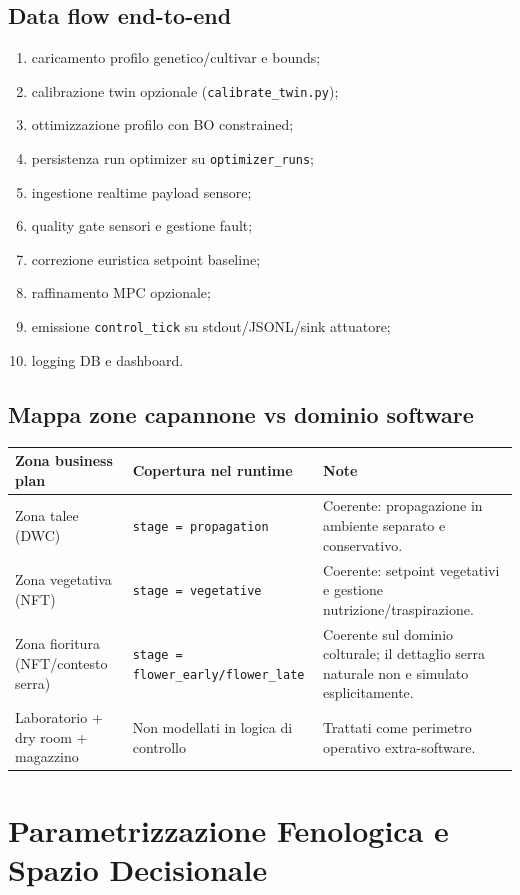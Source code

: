 ﻿\documentclass[11pt,a4paper]{report}
\begin{document}
\section{Data flow end-to-end}
\begin{enumerate}
  \item caricamento profilo genetico/cultivar e bounds;
  \item calibrazione twin opzionale (\texttt{calibrate\_twin.py});
  \item ottimizzazione profilo con BO constrained;
  \item persistenza run optimizer su \texttt{optimizer\_runs};
  \item ingestione realtime payload sensore;
  \item quality gate sensori e gestione fault;
  \item correzione euristica setpoint baseline;
  \item raffinamento MPC opzionale;
  \item emissione \texttt{control\_tick} su stdout/JSONL/sink attuatore;
  \item logging DB e dashboard.
\end{enumerate}

\section{Mappa zone capannone vs dominio software}
\begin{longtable}{@{}p{4.2cm}p{4.0cm}p{6.8cm}@{}}
\toprule
Zona business plan & Copertura nel runtime & Note \\ \midrule
Zona talee (DWC) & \texttt{stage = propagation} & Coerente: propagazione in ambiente separato e conservativo. \\
Zona vegetativa (NFT) & \texttt{stage = vegetative} & Coerente: setpoint vegetativi e gestione nutrizione/traspirazione. \\
Zona fioritura (NFT/contesto serra) & \texttt{stage = flower\_early/flower\_late} & Coerente sul dominio colturale; il dettaglio serra naturale non e simulato esplicitamente. \\
Laboratorio + dry room + magazzino & Non modellati in logica di controllo & Trattati come perimetro operativo extra-software. \\
\bottomrule
\end{longtable}

\newpage
\chapter{Parametrizzazione Fenologica e Spazio Decisionale}
\end{document}
